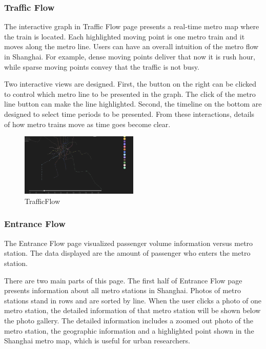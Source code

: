 \documentclass{proc}
\begin{document}
\subsubsection{Traffic Flow}
The interactive graph in Traffic Flow page presents a real-time metro map where the train is located. Each highlighted moving point is one metro train and it moves along the metro line. Users can have an overall intuition of the metro flow in Shanghai. For example, dense moving points deliver that now it is rush hour, while sparse moving points convey that the traffic is not busy. 

Two interactive views are designed. First, the button on the right can be clicked to control which metro line to be presented in the graph. The click of the metro line button can make the line highlighted. Second, the timeline on the bottom are designed to select time periods to be presented. From these interactions, details of how metro trains move as time goes become clear. 

\begin{figure}[t]
	\centering
	\includegraphics[width=0.5\textwidth]{img/TrafficFlow}
	\caption{TrafficFlow}
	\label{fig:curve}
\end{figure}

\subsubsection{Entrance Flow}
The Entrance Flow page visualized passenger volume information versus metro station. The data displayed are the amount of passenger who enters the metro station. 

There are two main parts of this page. The first half of Entrance Flow page presents information about all metro stations in Shanghai. Photos of metro stations stand in rows and are sorted by line. When the user clicks a photo of one metro station, the detailed information of that metro station will be shown below the photo gallery. The detailed information includes a zoomed out photo of the metro station, the geographic information and a highlighted point shown in the Shanghai metro map, which is useful for urban researchers.
\end{document}
